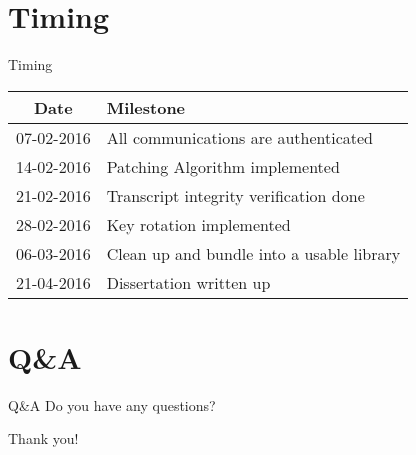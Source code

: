 \documentclass{beamer}
\begin{document}
\section{Timing}
\begin{frame}{Timing}
    \begin{tabular*}{0.9\textwidth}{c | l}
        Date & Milestone \\ 
        \hline
        07-02-2016 & All communications are authenticated \\
        14-02-2016 & Patching Algorithm implemented \\
        21-02-2016 & Transcript integrity verification done \\ 
        28-02-2016 & Key rotation implemented \\
        06-03-2016 & Clean up and bundle into a usable library\\
        21-04-2016 & Dissertation written up \\
    \end{tabular*}
\end{frame}

\section{Q\&A}
\begin{frame}{Q\&A}
    \Large{Do you have any questions?}
\end{frame}

\begin{frame}
    \centering
    \Large{Thank you!}
\end{frame}
\end{document}
